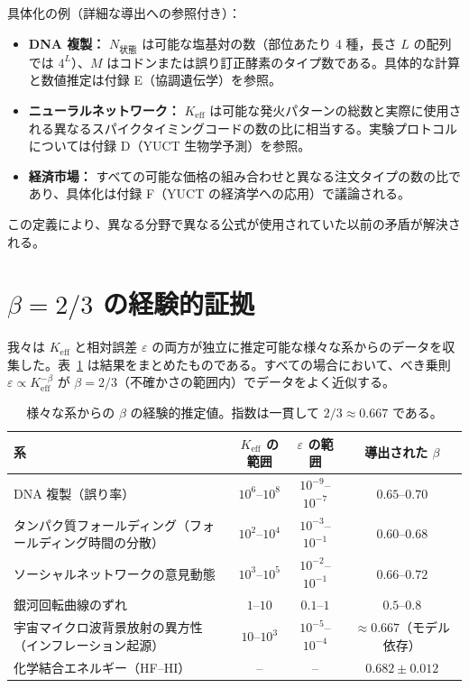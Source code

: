 \documentclass[11pt,a4paper]{article}
\newcommand{\Keff}{K_{\mathrm{eff}}}
\newcommand{\eps}{\varepsilon}
\begin{document}
	具体化の例（詳細な導出への参照付き）：
	\begin{itemize}
		\item \textbf{DNA 複製：} \(N_{\text{状態}}\) は可能な塩基対の数（部位あたり 4 種，長さ \(L\) の配列では \(4^L\)）、\(M\) はコドンまたは誤り訂正酵素のタイプ数である。具体的な計算と数値推定は付録 E（協調遺伝学）を参照。
		\item \textbf{ニューラルネットワーク：} \(\Keff\) は可能な発火パターンの総数と実際に使用される異なるスパイクタイミングコードの数の比に相当する。実験プロトコルについては付録 D（YUCT 生物学予測）を参照。
		\item \textbf{経済市場：} すべての可能な価格の組み合わせと異なる注文タイプの数の比であり、具体化は付録 F（YUCT の経済学への応用）で議論される。
	\end{itemize}
	この定義により、異なる分野で異なる公式が使用されていた以前の矛盾が解決される。
	
	\section{\(\beta = 2/3\) の経験的証拠}
	\label{sec:evidence}
	
	我々は \(\Keff\) と相対誤差 \(\eps\) の両方が独立に推定可能な様々な系からのデータを収集した。表~\ref{tab:data} は結果をまとめたものである。すべての場合において、べき乗則 \(\eps \propto \Keff^{-\beta}\) が \(\beta = 2/3\)（不確かさの範囲内）でデータをよく近似する。
	
	\begin{table}[htbp]
		\centering
		\caption{様々な系からの \(\beta\) の経験的推定値。指数は一貫して \(2/3 \approx 0.667\) である。}
		\label{tab:data}
		\begin{tabular}{lccc}
			\toprule
			系 & \(\Keff\) の範囲 & \(\eps\) の範囲 & 導出された \(\beta\) \\
			\midrule
			DNA 複製（誤り率） & \(10^6\)–\(10^8\) & \(10^{-9}\)–\(10^{-7}\) & \(0.65\)–\(0.70\) \\
			タンパク質フォールディング（フォールディング時間の分散） & \(10^2\)–\(10^4\) & \(10^{-3}\)–\(10^{-1}\) & \(0.60\)–\(0.68\) \\
			ソーシャルネットワークの意見動態 & \(10^3\)–\(10^5\) & \(10^{-2}\)–\(10^{-1}\) & \(0.66\)–\(0.72\) \\
			銀河回転曲線のずれ & \(1\)–\(10\) & \(0.1\)–\(1\) & \(0.5\)–\(0.8\) \\
			宇宙マイクロ波背景放射の異方性（インフレーション起源） & \(10\)–\(10^3\) & \(10^{-5}\)–\(10^{-4}\) & \(\approx 0.667\)（モデル依存） \\
			化学結合エネルギー（HF–HI） & – & – & \(0.682 \pm 0.012\) \\
			\bottomrule
		\end{tabular}
	\end{table}
	
\end{document}
